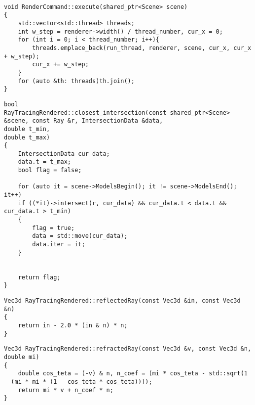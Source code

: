 \begin{center}
	\captionsetup{justification=raggedright,singlelinecheck=off}
	\begin{lstlisting}[label=lst:parallel,caption=Распараллеливание трассировки лучей]
		
void RenderCommand::execute(shared_ptr<Scene> scene)
{
	std::vector<std::thread> threads;
	int w_step = renderer->width() / thread_number, cur_x = 0;
	for (int i = 0; i < thread_number; i++){
		threads.emplace_back(run_thread, renderer, scene, cur_x, cur_x + w_step);
		cur_x += w_step;
	}
	for (auto &th: threads)th.join();
}
\end{lstlisting}
\end{center}

\newpage

\begin{center}
    \captionsetup{justification=raggedright,singlelinecheck=off}
    \begin{lstlisting}[label=lst:intersec,caption=Поиск ближайшего пересечения луча с объктом сцены]
bool
RayTracingRendered::closest_intersection(const shared_ptr<Scene> &scene, const Ray &r, IntersectionData &data,
double t_min,
double t_max)
{
	IntersectionData cur_data;
	data.t = t_max;
	bool flag = false;
	
	for (auto it = scene->ModelsBegin(); it != scene->ModelsEnd(); it++)
	if ((*it)->intersect(r, cur_data) && cur_data.t < data.t && cur_data.t > t_min)
	{
		flag = true;
		data = std::move(cur_data);
		data.iter = it;
	}
	
	
	return flag;
}
\end{lstlisting}
\end{center}


\begin{center}
    \captionsetup{justification=raggedright,singlelinecheck=off}
    \begin{lstlisting}[label=lst:reflect,caption=Расчёт отражённого луча]
Vec3d RayTracingRendered::reflectedRay(const Vec3d &in, const Vec3d &n)
{
	return in - 2.0 * (in & n) * n;
}
\end{lstlisting}
\end{center}

\newpage

\begin{center}
	\captionsetup{justification=raggedright,singlelinecheck=off}
	\begin{lstlisting}[label=lst:refract,caption=Расчёт преломлённого луча]
Vec3d RayTracingRendered::refractedRay(const Vec3d &v, const Vec3d &n, double mi)
{
	double cos_teta = (-v) & n, n_coef = (mi * cos_teta - std::sqrt(1 - (mi * mi * (1 - cos_teta * cos_teta))));
	return mi * v + n_coef * n;
}
	\end{lstlisting}
\end{center}

